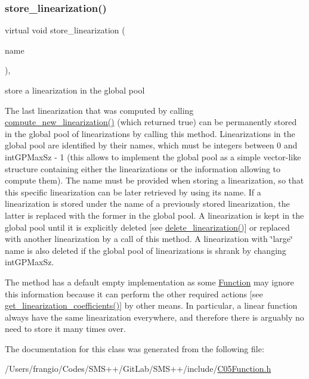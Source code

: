 \subsubsection{\texorpdfstring{store\+\_\+linearization()}{store\_linearization()}}
{\footnotesize\ttfamily virtual void store\+\_\+linearization (\begin{DoxyParamCaption}\item[{const \mbox{\hyperlink{class_s_m_spp__di__unipi__it_1_1_c05_function_ae90bf93c6d4b4ada66791c735d1c03cc}{Linearization\+Name}}}]{name }\end{DoxyParamCaption})\hspace{0.3cm}{\ttfamily [inline]}, {\ttfamily [virtual]}}



store a linearization in the global pool 

The last linearization that was computed by calling \mbox{\hyperlink{class_s_m_spp__di__unipi__it_1_1_c05_function_a9a77f2430dcf732f6d6d9fd50d923baf}{compute\+\_\+new\+\_\+linearization()}} (which returned true) can be permanently stored in the global pool of linearizations by calling this method. Linearizations in the global pool are identified by their names, which must be integers between 0 and int\+G\+P\+Max\+Sz -\/ 1 (this allows to implement the global pool as a simple vector-\/like structure containing either the linearizations or the information allowing to compute them). The name must be provided when storing a linearization, so that this specific linearization can be later retrieved by using its name. If a linearization is stored under the name of a previously stored linearization, the latter is replaced with the former in the global pool. A linearization is kept in the global pool until it is explicitly deleted \mbox{[}see \mbox{\hyperlink{class_s_m_spp__di__unipi__it_1_1_c05_function_a538bfc1740cb18a36b0edf8b35085e2c}{delete\+\_\+linearization()}}\mbox{]} or replaced with another linearization by a call of this method. A linearization with \char`\"{}large\char`\"{} name is also deleted if the global pool of linearizations is shrank by changing int\+G\+P\+Max\+Sz.

The method has a default empty implementation as some \mbox{\hyperlink{class_s_m_spp__di__unipi__it_1_1_function}{Function}} may ignore this information because it can perform the other required actions \mbox{[}see \mbox{\hyperlink{class_s_m_spp__di__unipi__it_1_1_c05_function_a6fa70047dc8b3d43a3ed44f1859a7239}{get\+\_\+linearization\+\_\+coefficients()}}\mbox{]} by other means. In particular, a linear function always have the same linearization everywhere, and therefore there is arguably no need to store it many times over. 

The documentation for this class was generated from the following file\+:\begin{DoxyCompactItemize}
\item 
/\+Users/frangio/\+Codes/\+S\+M\+S++/\+Git\+Lab/\+S\+M\+S++/include/\mbox{\hyperlink{_c05_function_8h}{C05\+Function.\+h}}\end{DoxyCompactItemize}
